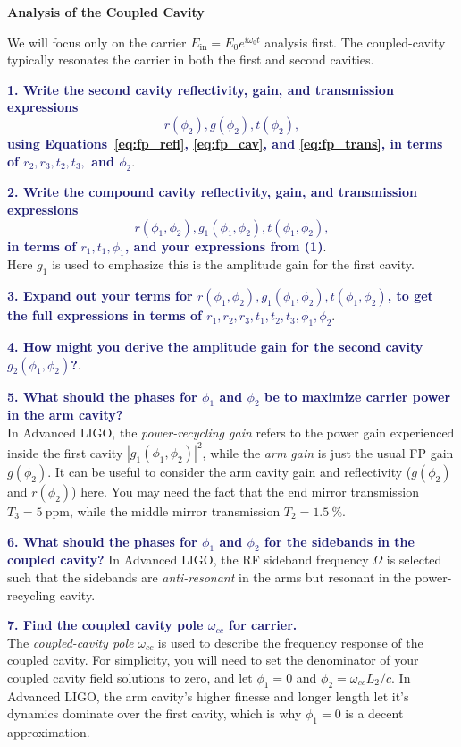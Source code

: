 \documentclass[11pt]{article}
\begin{document}
\vspace{0.5cm}

\noindent
\textbf{Analysis of the Coupled Cavity}

We will focus only on the carrier $E_\mathrm{in} = E_0 e^{i \omega_0 t}$ analysis first.
The coupled-cavity typically resonates the carrier in both the first and second cavities.

\textcolor{MidnightBlue}{\textbf{1. Write the second cavity reflectivity, gain, and transmission expressions $$r(\phi_2), g(\phi_2), t(\phi_2),$$ using Equations~\ref{eq:fp_refl}, \ref{eq:fp_cav}, and \ref{eq:fp_trans}, in terms of $r_2,r_3, t_2, t_3,$ and $\phi_2$}}.

\textcolor{MidnightBlue}{\textbf{2. Write the compound cavity reflectivity, gain, and transmission expressions $$r(\phi_1,\phi_2), g_1(\phi_1,\phi_2), t(\phi_1,\phi_2),$$ in terms of $r_1,t_1,\phi_1$, and your expressions from (1)}}.\\
Here $g_1$ is used to emphasize this is the amplitude gain for the first cavity.

\textcolor{MidnightBlue}{\textbf{3. Expand out your terms for $r(\phi_1,\phi_2), g_1(\phi_1,\phi_2), t(\phi_1,\phi_2)$, to get the full expressions in terms of $r_1,r_2,r_3,t_1,t_2,t_3,\phi_1,\phi_2$}}.

\textcolor{MidnightBlue}{\textbf{4. How might you derive the amplitude gain for the second cavity $g_2(\phi_1,\phi_2)$?}}.

\textcolor{MidnightBlue}{\textbf{5. What should the phases for $\phi_1$ and $\phi_2$ be to maximize carrier power in the arm cavity?}}\\
In Advanced LIGO, the \textit{power-recycling gain} refers to the power gain experienced inside the first cavity $|g_1(\phi_1,\phi_2)|^2$, while the \textit{arm gain} is just the usual FP gain $g(\phi_2)$.
It can be useful to consider the arm cavity gain and reflectivity ($g(\phi_2)$ and $r(\phi_2)$) here.
You may need the fact that the end mirror transmission $T_3 = 5~\mathrm{ppm}$, while the middle mirror transmission $T_2 = 1.5~\%$.

\textcolor{MidnightBlue}{\textbf{6. What should the phases for $\phi_1$ and $\phi_2$ for the sidebands in the coupled cavity?}}
In Advanced LIGO, the RF sideband frequency $\Omega$ is selected such that the sidebands are \textit{anti-resonant} in the arms but resonant in the power-recycling cavity.

\textcolor{MidnightBlue}{\textbf{7. Find the coupled cavity pole $\omega_{cc}$ for carrier.}}\\
The \textit{coupled-cavity pole} $\omega_{cc}$ is used to describe the frequency response of the coupled cavity.
For simplicity, you will need to set the denominator of your coupled cavity field solutions to zero, and let $\phi_1 = 0$ and $\phi_2 = \omega_{cc} L_2 / c$.
In Advanced LIGO, the arm cavity's higher finesse and longer length let it's dynamics dominate over the first cavity, which is why $\phi_1 = 0$ is a decent approximation.
\end{document}
